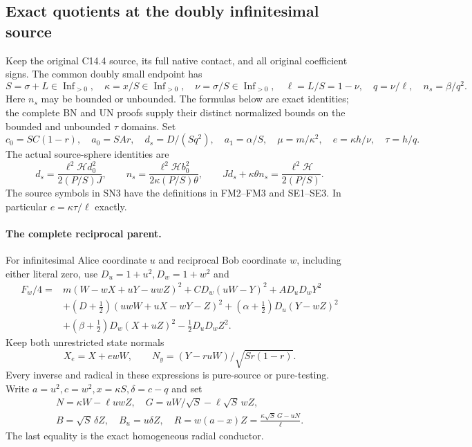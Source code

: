 \subsection{Exact quotients at the doubly infinitesimal source}

\label{component:p1de5b12d1927}

\label{p1de5b12d1927:sec:new-c144-small-nu-bounded-beta}

Keep the original C14.4 source, its full native contact, and all
original coefficient signs.  The common doubly small endpoint has
\[
 S=\sigma+L\in\operatorname{Inf}_{>0},\quad\kappa=x/S\in\operatorname{Inf}_{>0},
 \quad\nu=\sigma/S\in\operatorname{Inf}_{>0},\quad
 \ell=L/S=1-\nu,\quad q=\nu/\ell,\quad n_s=\beta/q^2.
                                                               \tag{SN1}
\]
Here $n_s$ may be bounded or unbounded.  The formulas below are
exact identities; the complete BN and UN proofs supply their distinct
normalized bounds on the bounded and unbounded $\tau$ domains.
Set
\[
 c_0=SC(1-r),\quad a_0=SAr,\quad d_s=D/(Sq^2),\quad
 a_1=\alpha/S,\quad\mu=m/\kappa^2,\quad
 e=\kappa h/\nu,\quad\tau=h/q.                         \tag{SN2}
\]
The actual source-sphere identities are
\[
 d_s=\frac{\ell^2\mathcal H d_0^2}{2(P/S)J},\qquad
 n_s=\frac{\ell^2\mathcal H b_0^2}{2\kappa(P/S)\theta},\qquad
 Jd_s+\kappa\theta n_s=\frac{\ell^2\mathcal H}{2(P/S)}.   \tag{SN3}
\]
The source symbols in SN3 have the definitions in FM2--FM3 and
SE1--SE3.  In particular $e=\kappa\tau/\ell$ exactly.
\paragraph{The complete reciprocal parent.}
For infinitesimal Alice coordinate $u$ and reciprocal Bob coordinate
$w$, including either literal zero, use $D_u=1+u^2,D_w=1+w^2$ and
\[
\begin{split}
 F_w/4={}&m(W-wX+uY-uwZ)^2+CD_w(uW-Y)^2+AD_uD_wY^2\\
 &+(D+\tfrac12)(uwW+uX-wY-Z)^2
 +(\alpha+\tfrac12)D_u(Y-wZ)^2\\
 &+(\beta+\tfrac12)D_w(X+uZ)^2-\tfrac12D_uD_wZ^2.
\end{split}\tag{SN5}
\]
Keep both unrestricted state normals
\[
 X_e=X+ewW,\qquad N_y=(Y-ruW)/\sqrt{Sr(1-r)}.
 \tag{SN6}
\]
Every inverse and radical in these expressions is pure-source or
pure-testing. Write $a=u^2,c=w^2,x=\kappa S,\delta=c-q$ and set
\[
\begin{gathered}
 N=\kappa W-\ell uwZ,\quad G=uW/\sqrt S-\ell\sqrt S\,wZ,\\
 B=\sqrt S\,\delta Z,\quad B_u=u\delta Z,\quad
 R=w(a-x)Z=\frac{\kappa\sqrt S\,G-uN}{\ell}.
\end{gathered}\tag{SN7}
\]
The last equality is the exact homogeneous radial conductor.

